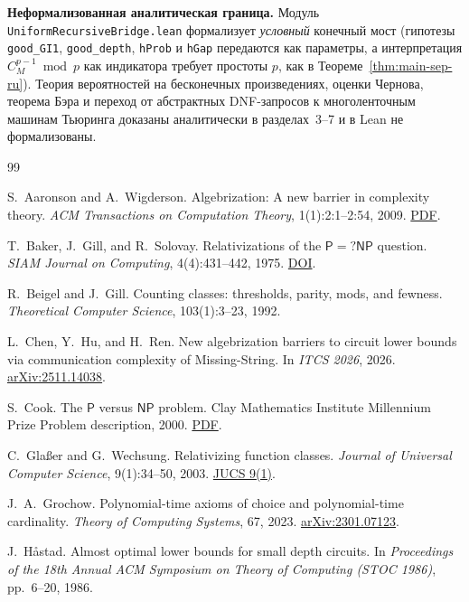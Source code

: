 \documentclass[11pt,a4paper]{article}
\theoremstyle{definition}
\theoremstyle{remark}
\newcommand{\Pcl}{\mathsf{P}}
\newcommand{\NP}{\mathsf{NP}}
\begin{document}
\textbf{Неформализованная аналитическая граница.} Модуль \texttt{UniformRecursiveBridge.lean} формализует \emph{условный} конечный мост (гипотезы \texttt{good\_GI1}, \texttt{good\_depth}, \texttt{hProb} и \texttt{hGap} передаются как параметры, а интерпретация $C_M^{p-1} \bmod p$ как индикатора требует простоты $p$, как в Теореме~\ref{thm:main-sep-ru}). Теория вероятностей на бесконечных произведениях, оценки Чернова, теорема Бэра и переход от абстрактных DNF-запросов к многоленточным машинам Тьюринга доказаны аналитически в разделах~3--7 и в Lean не формализованы.

\begin{thebibliography}{99}

S.~Aaronson and A.~Wigderson.
Algebrization: A new barrier in complexity theory.
\emph{ACM Transactions on Computation Theory}, 1(1):2:1--2:54, 2009.
\href{https://www.scottaaronson.com/papers/alg.pdf}{PDF}.

T.~Baker, J.~Gill, and R.~Solovay.
Relativizations of the $\Pcl = ?\NP$ question.
\emph{SIAM Journal on Computing}, 4(4):431--442, 1975.
\href{https://epubs.siam.org/doi/10.1137/0204037}{DOI}.

R.~Beigel and J.~Gill.
Counting classes: thresholds, parity, mods, and fewness.
\emph{Theoretical Computer Science}, 103(1):3--23, 1992.

L.~Chen, Y.~Hu, and H.~Ren.
New algebrization barriers to circuit lower bounds via communication complexity of Missing-String.
In \emph{ITCS 2026}, 2026.
\href{https://arxiv.org/abs/2511.14038}{arXiv:2511.14038}.

S.~Cook.
The $\Pcl$ versus $\NP$ problem.
Clay Mathematics Institute Millennium Prize Problem description, 2000.
\href{https://www.claymath.org/wp-content/uploads/2022/06/pvsnp.pdf}{PDF}.

C.~Gla\ss er and G.~Wechsung.
Relativizing function classes.
\emph{Journal of Universal Computer Science}, 9(1):34--50, 2003.
\href{https://lib.jucs.org/issue/4069/}{JUCS 9(1)}.

J.~A.~Grochow.
Polynomial-time axioms of choice and polynomial-time cardinality.
\emph{Theory of Computing Systems}, 67, 2023.
\href{https://arxiv.org/abs/2301.07123}{arXiv:2301.07123}.

J.~H\aa stad.
Almost optimal lower bounds for small depth circuits.
In \emph{Proceedings of the 18th Annual ACM Symposium on Theory of Computing (STOC 1986)}, pp.~6--20, 1986.


\end{thebibliography}
\end{document}
